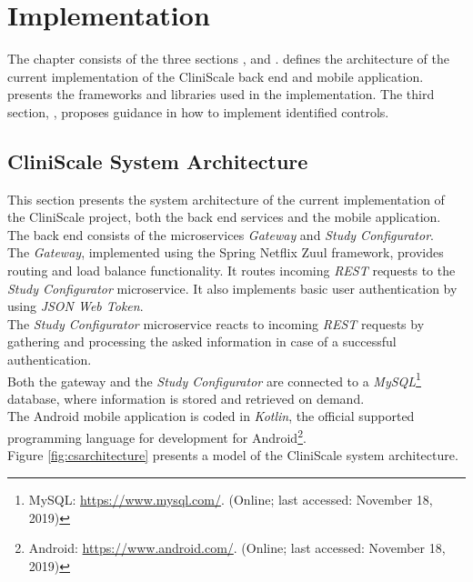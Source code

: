 \chapter{Implementation}
\label{implementation}
The chapter \textit{} consists of the three sections \textit{}, \textit{} and \textit{}. \textit{} defines the architecture of the current implementation of the CliniScale back end and mobile application. \textit{} presents the frameworks and libraries used in the implementation. The third section, \textit{}, proposes guidance in how to implement identified controls.

\section{CliniScale System Architecture}
\label{sysarchitecture}
This section presents the system architecture of the current implementation of the CliniScale project, both the back end services and the mobile application.
\newline
The back end consists of the microservices \textit{Gateway} and \textit{Study Configurator}.\\
The \textit{Gateway}, implemented using the Spring Netflix Zuul framework, provides routing and load balance functionality. It routes incoming \textit{REST} requests to the \textit{Study Configurator} microservice. It also implements basic user authentication by using \textit{JSON Web Token}.\\
The \textit{Study Configurator} microservice reacts to incoming \textit{REST} requests by gathering and processing the asked information in case of a successful authentication.\\
Both the gateway and the \textit{Study Configurator} are connected to a \textit{MySQL}\footnote{MySQL: \url{https://www.mysql.com/}. (Online; last accessed:  November 18, 2019)} database, where information is stored and retrieved on demand.\\
\newline
The Android mobile application is coded in \textit{Kotlin}, the official supported programming language for development for Android\footnote{Android: \url{https://www.android.com/}. (Online; last accessed:  November 18, 2019)}.\\
\newline
Figure \ref{fig:csarchitecture} presents a model of the CliniScale system architecture.

